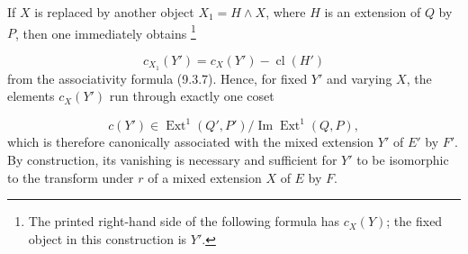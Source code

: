 If $X$ is replaced by another object $X_1=H\wedge X$, where $H$ is an
extension of $Q$ by $P$, then one immediately obtains
\footnote{The printed right-hand side of the following formula has
$c_X(Y)$; the fixed object in this construction is $Y'$.}

\begin{equation*}
c_{X_1}(Y')=c_X(Y')-\operatorname{cl}(H')
\end{equation*}
from the associativity formula (9.3.7). Hence, for fixed $Y'$ and varying
$X$, the elements $c_X(Y')$ run through exactly one coset

\begin{equation}\tag{9.3.13}
c(Y')\in
\operatorname{Ext}^1(Q',P')/
\operatorname{Im}\operatorname{Ext}^1(Q,P),
\end{equation}
which is therefore canonically associated with the mixed extension $Y'$ of
$E'$ by $F'$. By construction, its vanishing is necessary and sufficient
for $Y'$ to be isomorphic to the transform under $r$ of a mixed extension
$X$ of $E$ by $F$.
